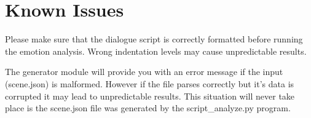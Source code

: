 \section{Known Issues}
\noindent Please make sure that the dialogue script is correctly formatted before running the emotion analysis. Wrong indentation levels may cause unpredictable results.

\noindent The generator module will provide you with an error message if the input (scene.json) is malformed. However if the file parses correctly but it's data is corrupted it may lead to unpredictable results. This situation will never take place is the scene.json file was generated by the script\_analyze.py program.


